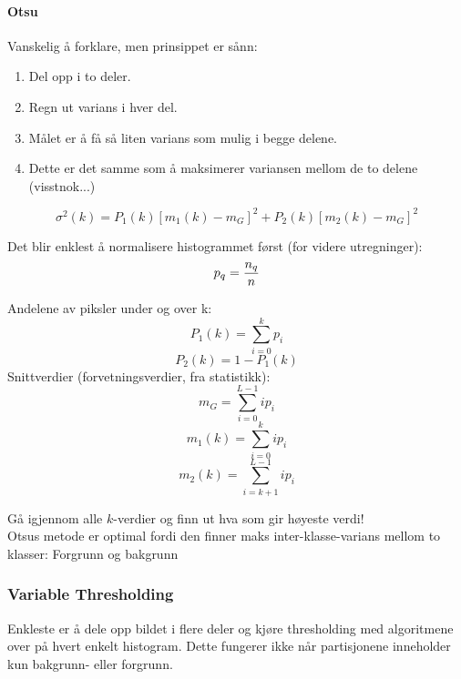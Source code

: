 \paragraph{Otsu}

Vanskelig å forklare, men prinsippet er sånn:

\begin{enumerate}
    \item Del opp i to deler.
    \item Regn ut varians i hver del.
    \item Målet er å få så liten varians som mulig i begge delene.
    \item Dette er det samme som å maksimerer variansen mellom de to delene (visstnok...)
\end{enumerate}

\begin{equation}
    \sigma^2(k) = P_1(k)[m_1(k)-m_G]^2 + P_2(k)[m_2(k)-m_G]^2
\end{equation}

Det blir enklest å normalisere histogrammet først (for videre utregninger):
\begin{equation}
    p_q = {n_q \over n}
\end{equation}

Andelene av piksler under og over k:
\begin{equation}
    P_1(k) = \sum_{i=0}^{k} p_i
\end{equation}
\begin{equation}
    P_2(k) = 1 - P_1(k)
\end{equation}
Snittverdier (forvetningsverdier, fra statistikk):
\begin{equation}
    m_G = \sum_{i=0}^{L-1}i p_i
\end{equation}
\begin{equation}
    m_1(k)= \sum_{i=0}^{k}i p_i
\end{equation}
\begin{equation}
    m_2(k)= \sum_{i={k+1}}^{L-1}i p_i
\end{equation}

Gå igjennom alle $k$-verdier og finn ut hva som gir høyeste verdi! \\
Otsus metode er optimal fordi den finner maks inter-klasse-varians mellom to klasser: Forgrunn og bakgrunn

\subsubsection{Variable Thresholding}
Enkleste er å dele opp bildet i flere deler og kjøre thresholding med algoritmene over på hvert enkelt histogram. Dette fungerer ikke når partisjonene inneholder kun bakgrunn- eller forgrunn.

